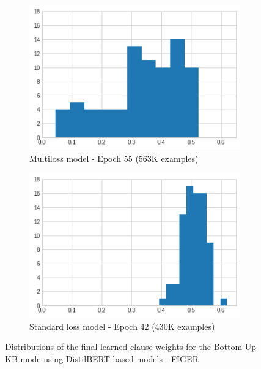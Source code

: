 \begin{figure}[bth]
     \centering
     \begin{subfigure}[b]{0.45\textwidth}
         \centering
         \includegraphics[width=\textwidth]{figures/weight_distrib_distilbert_figer_bu_multiloss.png}
         \caption{Multiloss model - Epoch 55 (563K examples)}
         \label{fig:weight_distrib_distilbert_figer_bu_multiloss}
     \end{subfigure}
     \hspace{10px}
     \begin{subfigure}[b]{0.45\textwidth}
         \centering
         \includegraphics[width=\textwidth]{figures/weight_distrib_distilbert_figer_bu_learnable.png}
         \caption{Standard loss model - Epoch 42 (430K examples)}
         \label{fig:weight_distrib_distilbert_figer_bu_learnable}
     \end{subfigure}
    \caption{Distributions of the final learned clause weights for the Bottom Up KB mode using DistilBERT-based models - FIGER}
    \label{fig:weight_distrib_distilbert_figer_bu}
\end{figure}

